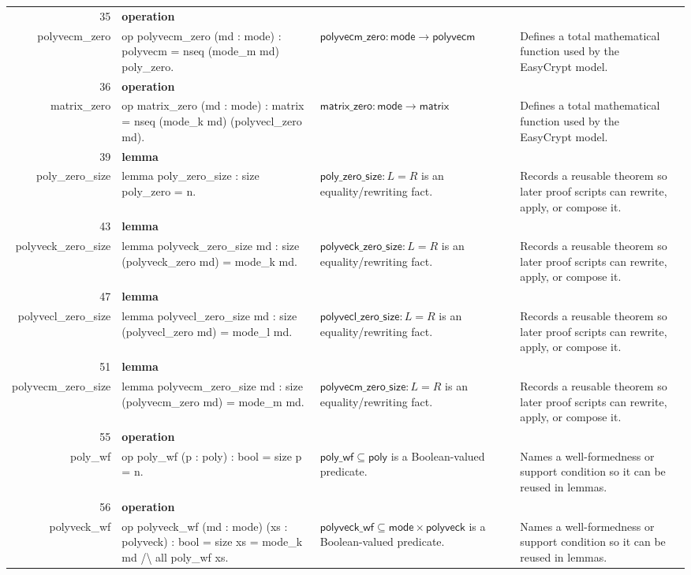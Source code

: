 \documentclass[10pt]{article}
\newcommand{\ec}[1]{\begingroup\ttfamily\scriptsize #1\endgroup}
\begin{document}
\begin{longtable}{r L{0.17\textwidth} L{0.26\textwidth} L{0.27\textwidth} L{0.20\textwidth}}
35 & \textbf{operation}\\\ec{polyvecm\_zero} & \ec{op polyvecm\_zero (md : mode) : polyvecm = nseq (mode\_m md) poly\_zero.} & \(\mathsf{polyvecm\_zero} : \mathsf{mode} \to \mathsf{polyvecm}\) & Defines a total mathematical function used by the EasyCrypt model. \\
36 & \textbf{operation}\\\ec{matrix\_zero} & \ec{op matrix\_zero (md : mode) : matrix = nseq (mode\_k md) (polyvecl\_zero md).} & \(\mathsf{matrix\_zero} : \mathsf{mode} \to \mathsf{matrix}\) & Defines a total mathematical function used by the EasyCrypt model. \\
39 & \textbf{lemma}\\\ec{poly\_zero\_size} & \ec{lemma poly\_zero\_size : size poly\_zero = n.} & \(\mathsf{poly\_zero\_size} : L = R\) is an equality/rewriting fact. & Records a reusable theorem so later proof scripts can rewrite, apply, or compose it. \\
43 & \textbf{lemma}\\\ec{polyveck\_zero\_size} & \ec{lemma polyveck\_zero\_size md : size (polyveck\_zero md) = mode\_k md.} & \(\mathsf{polyveck\_zero\_size} : L = R\) is an equality/rewriting fact. & Records a reusable theorem so later proof scripts can rewrite, apply, or compose it. \\
47 & \textbf{lemma}\\\ec{polyvecl\_zero\_size} & \ec{lemma polyvecl\_zero\_size md : size (polyvecl\_zero md) = mode\_l md.} & \(\mathsf{polyvecl\_zero\_size} : L = R\) is an equality/rewriting fact. & Records a reusable theorem so later proof scripts can rewrite, apply, or compose it. \\
51 & \textbf{lemma}\\\ec{polyvecm\_zero\_size} & \ec{lemma polyvecm\_zero\_size md : size (polyvecm\_zero md) = mode\_m md.} & \(\mathsf{polyvecm\_zero\_size} : L = R\) is an equality/rewriting fact. & Records a reusable theorem so later proof scripts can rewrite, apply, or compose it. \\
55 & \textbf{operation}\\\ec{poly\_wf} & \ec{op poly\_wf (p : poly) : bool = size p = n.} & \(\mathsf{poly\_wf} \subseteq \mathsf{poly}\) is a Boolean-valued predicate. & Names a well-formedness or support condition so it can be reused in lemmas. \\
56 & \textbf{operation}\\\ec{polyveck\_wf} & \ec{op polyveck\_wf (md : mode) (xs : polyveck) : bool = size xs = mode\_k md /\textbackslash{} all poly\_wf xs.} & \(\mathsf{polyveck\_wf} \subseteq \mathsf{mode} \times \mathsf{polyveck}\) is a Boolean-valued predicate. & Names a well-formedness or support condition so it can be reused in lemmas. \\

\end{longtable}
\end{document}
